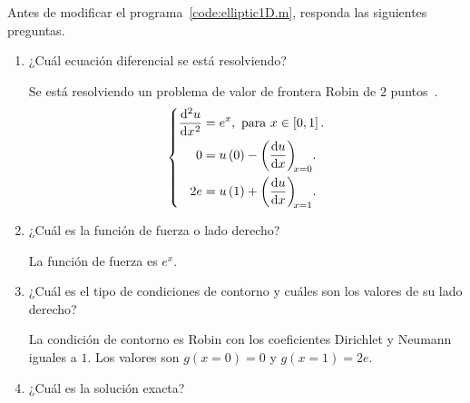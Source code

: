 \begin{problem}

Antes de modificar el programa~\ref{code:elliptic1D.m}, responda las
siguientes preguntas.

\begin{enumerate}
  \item

        ¿Cuál ecuación diferencial se está resolviendo?

        \begin{solution}
          Se está resolviendo un problema de valor de frontera Robin
          de $2$ puntos~\cite{CORBINO2020112326}.
          \begin{equation}\label{eq:poisson1drobindconditions}
            \left\{
            \begin{aligned}
              \diff[2]{u}{x}
               & =e^{x},
              \text{ para }x\in\left[0,1\right].     \\
              0
               & = u\left(0\right)-\diff{u}{x}[x=0]. \\
              2e
               & =u\left(1\right)+\diff{u}{x}[x=1].
            \end{aligned}
            \right.
          \end{equation}
          \noQED
        \end{solution}

  \item

        ¿Cuál es la función de fuerza o lado derecho?

        \begin{solution}
          La función de fuerza es $e^{x}$.
          \noQED
        \end{solution}

  \item

        ¿Cuál es el tipo de condiciones de contorno y cuáles son
        los valores de su lado derecho?

        \begin{solution}
          La condición de contorno es Robin con los
          coeficientes Dirichlet y Neumann iguales a $1$.
          Los valores son $g\left(x=0\right)=0$ y
          $g\left(x=1\right)=2e$.
          \noQED
        \end{solution}

  \item

        ¿Cuál es la solución exacta?


\end{enumerate}
\end{problem}
